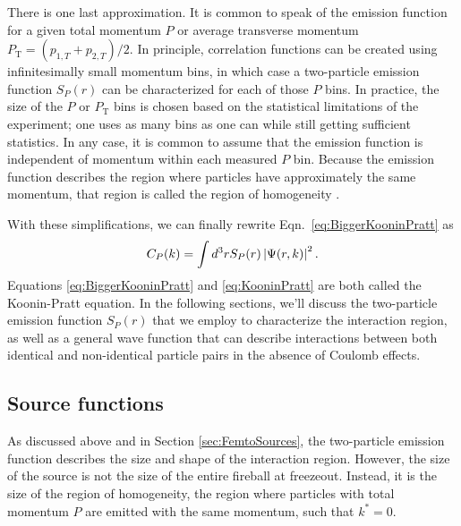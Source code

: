 There is one last approximation. It is common to speak of the emission function for a given total momentum $P$ or average transverse momentum $P_\mathrm{T} = (p_{1,T} + p_{2,T})/2$.
In principle, correlation functions can be created using infinitesimally small momentum bins, in which case a two-particle emission function $S_P(r)$ can be characterized for each of those $P$ bins.
In practice, the size of the $P$ or $P_\mathrm{T}$ bins is chosen based on the statistical limitations of the experiment; one uses as many bins as one can while still getting sufficient statistics.
In any case, it is common to assume that the emission function is independent of momentum within each measured $P$ bin.
Because the emission function describes the region where particles have approximately the same momentum, that region is called the region of homogeneity \cite{Akkelin:1995gh}.

With these simplifications, we can finally rewrite Eqn.\ \ref{eq:BiggerKooninPratt} as 
\begin{equation}
\label{eq:KooninPratt}
C_P(k) =  \int d^3r S_{P} (r) \left\lvert\Psi(r,k)\right\rvert^2.
\end{equation}
Equations \ref{eq:BiggerKooninPratt} and \ref{eq:KooninPratt} are both called the Koonin-Pratt equation. 
In the following sections, we'll discuss the two-particle emission function $S_P(r)$ that we employ to characterize the interaction region, as well as a general wave function that can describe interactions between both identical and non-identical particle pairs in the absence of Coulomb effects.

\subsection{Source functions}
\label{sec:SourceFunctions}

As discussed above and in Section \ref{sec:FemtoSources}, the two-particle emission function describes the size and shape of the interaction region.
However, the size of the source is not the size of the entire fireball at freezeout.
Instead, it is the size of the region of homogeneity, the region where particles with total momentum $P$ are emitted with the same momentum, such that $k^* = 0$.

